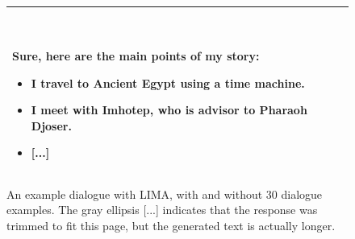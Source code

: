 \begin{figure}[p]
\begin{tabular}{@{}p{}p{}@{}}
    ~
    
    Sure, here are the main points of my story:
    \begin{itemize}[leftmargin=8pt]
    \item I travel to Ancient Egypt using a time machine.
    \item I meet with Imhotep, who is advisor to Pharaoh Djoser.
    \item \textcolor[HTML]{808080}{[...]}
    \end{itemize}
    
    
    
    
    
    
    
      
        
        
      
      
        
        
      
      
        
        
      
      
        
        
      

    \\
    \bottomrule
    \end{tabular}
    \caption{An example dialogue with LIMA, with and without 30 dialogue examples. The gray ellipsis \textcolor[HTML]{808080}{[...]} indicates that the response was trimmed to fit this page, but the generated text is actually longer.}
    \label{fig:dialogue}
\end{figure}